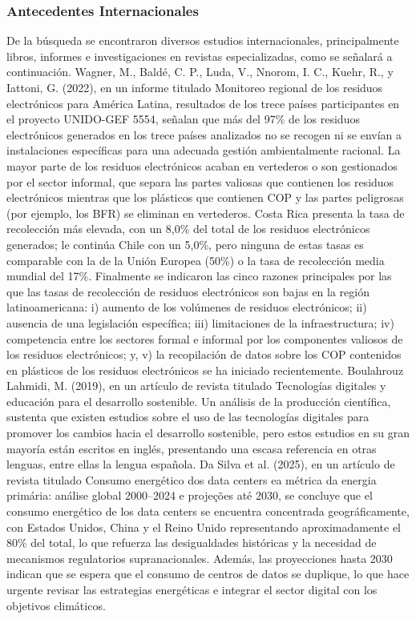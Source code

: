 \documentclass[stu,12pt,a4paper]{apa7}
\begin{document}
    \subsubsection{Antecedentes Internacionales}
    De la búsqueda se encontraron diversos estudios internacionales, principalmente libros, informes e investigaciones en revistas especializadas, como se señalará a continuación.
Wagner, M., Baldé, C. P., Luda, V., Nnorom, I. C., Kuehr, R., y Iattoni, G. (2022), en un informe titulado Monitoreo regional de los residuos electrónicos para América Latina, resultados de los trece países participantes en el proyecto UNIDO-GEF 5554, señalan que más del 97\% de los residuos electrónicos generados en los trece países analizados no se recogen ni se envían a instalaciones específicas para una adecuada gestión ambientalmente racional. La mayor parte de los residuos electrónicos acaban en vertederos o son gestionados por el sector informal, que separa las partes valiosas que contienen los residuos electrónicos mientras que los plásticos que contienen COP y las partes peligrosas (por ejemplo, los BFR) se eliminan en vertederos. Costa Rica presenta la tasa de recolección más elevada, con un 8,0\% del total de los residuos electrónicos generados; le continúa Chile con un 5,0\%, pero ninguna de estas tasas es comparable con la de la Unión Europea (50\%) o la tasa de recolección media mundial del 17\%. Finalmente se indicaron las cinco razones principales por las que las tasas de recolección de residuos electrónicos son bajas en la región latinoamericana: i) aumento de los volúmenes de residuos electrónicos; ii) ausencia de una legislación específica; iii) limitaciones de la infraestructura; iv) competencia entre los sectores formal e informal por los componentes valiosos de los residuos electrónicos; y, v) la recopilación de datos sobre los COP contenidos en plásticos de los residuos electrónicos se ha iniciado recientemente.
Boulahrouz Lahmidi, M. (2019), en un artículo de revista titulado Tecnologías digitales y educación para el desarrollo sostenible. Un análisis de la producción científica, sustenta que existen estudios sobre el uso de las tecnologías digitales para promover los cambios hacia el desarrollo sostenible, pero estos estudios en su gran mayoría están escritos en inglés, presentando una escasa referencia en otras lenguas, entre ellas la lengua española.
Da Silva et al. (2025), en un artículo de revista titulado Consumo energético dos data centers ea métrica da energia primária: análise global 2000–2024 e projeções até 2030, se concluye que el consumo energético de los data centers se encuentra concentrada geográficamente, con Estados Unidos, China y el Reino Unido representando aproximadamente el 80\% del total, lo que refuerza las desigualdades históricas y la necesidad de mecanismos regulatorios supranacionales. Además, las proyecciones hasta 2030 indican que se espera que el consumo de centros de datos se duplique, lo que hace urgente revisar las estrategias energéticas e integrar el sector digital con los objetivos climáticos.
\end{document}
